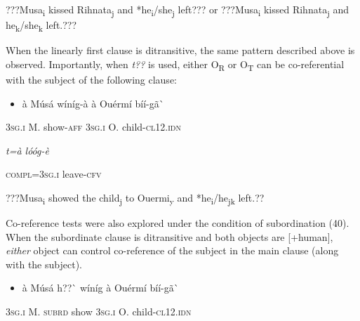 \documentclass[output=paper]{langsci/langscibook}
\begin{document}
{{{{{\begin{styleTranslation}
???Musa\textsubscript{i} kissed Rihnata\textsubscript{j} and *he\textsubscript{i}/she\textsubscript{j} left??? or ???Musa\textsubscript{i} kissed Rihnata\textsubscript{j} and he\textsubscript{k}/she\textsubscript{k} left.???
\end{styleTranslation}

When the linearly first clause is ditransitive, the same pattern described above is observed. Importantly, when \textit{t??} is used, either O\textsubscript{R} or O\textsubscript{T }can be co-referential with the subject of the following clause:

\begin{itemize}
\item \begin{styleNumberedEX}
\`{a}    M\'{u}s\'{a}  w\'{i}n\'{i}g-\`{a}  \`{a}    Ou\'{e}rm\'{i}  b\'{i}\'{i}-g\~{a}\`{ }        
\end{styleNumberedEX}\end{itemize}
\begin{styleGloss}
\textsc{3sg.i  }  M.  show-\textsc{aff}  \textsc{3sg.i  }  O.    child-\textsc{cl12.idn}     
\end{styleGloss}

\begin{styleGloss}
\textit{  t=\`{a}      l\'{o}\'{o}g-\`{e}}
\end{styleGloss}

\begin{styleGloss}
\textsc{  compl=3sg.i}        leave-\textsc{cfv}
\end{styleGloss}

\begin{styleTranslation}
???Musa\textsubscript{i}  showed the child\textsubscript{j} to Ouermi\textsubscript{y} and *he\textsubscript{i}/he\textsubscript{jk} left.??
\end{styleTranslation}

Co-reference tests were also explored under the condition of subordination (40). When the subordinate clause is ditransitive and both objects are [+human], \textit{either} object can control co-reference of the subject in the main clause (along with the subject).

\begin{itemize}
\item \begin{styleNumberedEX}
\label{bkm:Ref424332520}\`{a}    M\'{u}s\'{a}  h??\`{ }    w\'{i}n\'{i}g  \`{a}    Ou\'{e}rm\'{i}      b\'{i}\'{i}-g\~{a}\`{ }    
\end{styleNumberedEX}\end{itemize}
\begin{styleGloss}
\textsc{3sg.i  }  M.  \textsc{subrd}    show  \textsc{3sg.i  }  O.        child-\textsc{cl12.idn}
\end{styleGloss}

}}}}}
\end{document}
